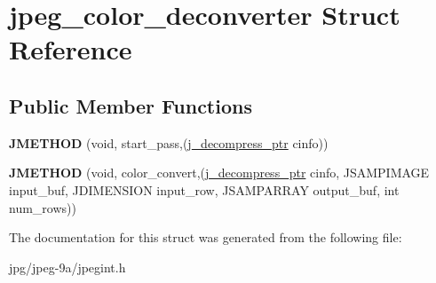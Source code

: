 \hypertarget{structjpeg__color__deconverter}{\section{jpeg\+\_\+color\+\_\+deconverter Struct Reference}
\label{structjpeg__color__deconverter}
}
\subsection*{Public Member Functions}
\begin{DoxyCompactItemize}
\item 
\hypertarget{structjpeg__color__deconverter_a90ddfc502a2aadc44f157007a3e49056}{{\bfseries J\+M\+E\+T\+H\+O\+D} (void, start\+\_\+pass,(\hyperlink{structjpeg__decompress__struct}{j\+\_\+decompress\+\_\+ptr} cinfo))}\label{structjpeg__color__deconverter_a90ddfc502a2aadc44f157007a3e49056}

\item 
\hypertarget{structjpeg__color__deconverter_ab0fedad382d6b40b3698181271bb4ba4}{{\bfseries J\+M\+E\+T\+H\+O\+D} (void, color\+\_\+convert,(\hyperlink{structjpeg__decompress__struct}{j\+\_\+decompress\+\_\+ptr} cinfo, J\+S\+A\+M\+P\+I\+M\+A\+G\+E input\+\_\+buf, J\+D\+I\+M\+E\+N\+S\+I\+O\+N input\+\_\+row, J\+S\+A\+M\+P\+A\+R\+R\+A\+Y output\+\_\+buf, int num\+\_\+rows))}\label{structjpeg__color__deconverter_ab0fedad382d6b40b3698181271bb4ba4}

\end{DoxyCompactItemize}


The documentation for this struct was generated from the following file\+:\begin{DoxyCompactItemize}
\item 
jpg/jpeg-\/9a/jpegint.\+h\end{DoxyCompactItemize}

